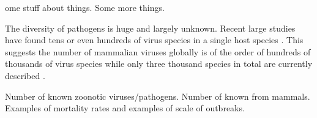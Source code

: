 

ome stuff about things. Some more things. 



The diversity of pathogens is huge and largely unknown.
Recent large studies have found tens \cite{anthony2013strategy} or even hundreds of virus species in a single host species \cite{anthony2015non}.
This suggests the number of mammalian viruses globally is of the order of hundreds of thousands of virus species \cite{anthony2013strategy} while only three thousand species in total are currently described \cite{ICTV}.





Number of known zoonotic viruses/pathogens.
Number of known from mammals.
Examples of mortality rates and examples of scale of outbreaks.









